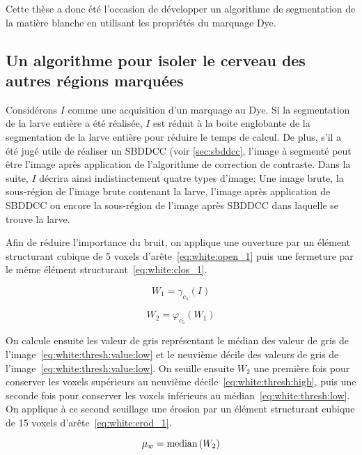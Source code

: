 \documentclass[\main/main.tex]{subfiles}
\begin{document}
%
Cette thèse a donc été l'occasion de développer un algorithme de segmentation de la matière blanche en utilisant les propriétés du marquage Dye.


\subsection{Un algorithme pour isoler le cerveau des autres régions marquées}

%
Considérons $I$ comme une acquisition d'un marquage au Dye.
%
Si la segmentation de la larve entière a été réalisée, $I$ est réduit à la boite englobante de la segmentation de la larve entière pour réduire le temps de calcul.
%
De plus, s'il a été jugé utile de réaliser un SBDDCC (voir \autoref{sec:sbddcc}, l'image à segmenté peut être l'image après application de l'algorithme de correction de contraste.
%
Dans la suite, $I$ décrira ainsi indistinctement quatre types d'image:
Une image brute, la sous-région de l'image brute contenant la larve,
l'image après application de SBDDCC ou encore la sous-région de l'image après SBDDCC dans laquelle se trouve la larve.

%
Afin de réduire l'importance du bruit, on applique une ouverture par un élément structurant cubique de 5 voxels d'arête~\eqref{eq:white:open_1} puis une fermeture par le même élément structurant~\eqref{eq:white:clos_1}.

\begin{equation}
\label{eq:white:open_1}
    W_1 = \gamma_{c_5}(I)
\end{equation}

\begin{equation}
\label{eq:white:clos_1}
    W_2 = \varphi_{c_5}(W_1)
\end{equation}

%
On calcule ensuite les valeur de gris représentant le médian des valeur de gris de l'image~\eqref{eq:white:thresh:value:low} et le neuvième décile des valeurs de gris de l'image~\eqref{eq:white:thresh:value:low}.
%
On seuille ensuite $W_2$ une première fois pour conserver les voxels supérieurs au neuvième décile~\eqref{eq:white:thresh:high}, puis une seconde fois pour conserver les voxels inférieurs au médian~\eqref{eq:white:thresh:low}.
%
On applique à ce second seuillage une érosion par un élément structurant cubique de 15 voxels d'arête~\eqref{eq:white:erod_1}.

\begin{equation}
\label{eq:white:thresh:value:low}
    \mu_w = \operatorname{\textnormal{median}}{}(W_2)
\end{equation}
\end{document}
